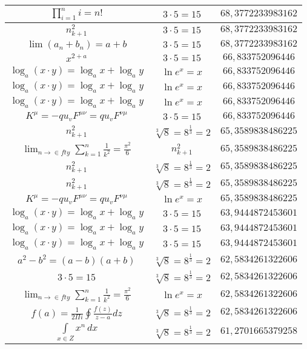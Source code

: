 \documentclass{article}
\begin{document}
\begin{flushleft}
\begin{longtable}{|c|c|c|}
$\prod_{i=1}^ni=n!$ & $3\cdot 5=15$ & $68,3772233983162$ \\ \hline 
$n_{k+1}^2$ & $3\cdot 5=15$ & $68,3772233983162$ \\ \hline 
$\lim\left(a_n+b_n\right)=a+b$ & $3\cdot 5=15$ & $68,3772233983162$ \\ \hline 
$x^{2+a}$ & $3\cdot 5=15$ & $66,833752096446$ \\ \hline 
$\log_{a}(x\cdot y)=\log_{a}x+\log_{a}y$ & $\ln e^x=x$ & $66,833752096446$ \\ \hline 
$\log_{a}(x\cdot y)=\log_{a}x+\log_{a}y$ & $\ln e^x=x$ & $66,833752096446$ \\ \hline 
$\log_{a}(x\cdot y)=\log_{a}x+\log_{a}y$ & $\ln e^x=x$ & $66,833752096446$ \\ \hline 
$K^\mu=-qu_vF^{\mu\nu}=qu_vF^{\nu\mu}$ & $3\cdot 5=15$ & $66,833752096446$ \\ \hline 
$n_{k+1}^2$ & $\sqrt[3]{8}=8^{\frac{1}{3}}=2$ & $65,3589838486225$ \\ \hline 
$\lim_{n\to\in fty}\sum_{k=1}^n\frac{1}{k^2}=\frac{\pi^2}{6}$ & $n_{k+1}^2$ & $65,3589838486225$ \\ \hline 
$n_{k+1}^2$ & $\sqrt[3]{8}=8^{\frac{1}{3}}=2$ & $65,3589838486225$ \\ \hline 
$n_{k+1}^2$ & $\sqrt[3]{8}=8^{\frac{1}{3}}=2$ & $65,3589838486225$ \\ \hline 
$K^\mu=-qu_vF^{\mu\nu}=qu_vF^{\nu\mu}$ & $\ln e^x=x$ & $65,3589838486225$ \\ \hline 
$\log_{a}(x\cdot y)=\log_{a}x+\log_{a}y$ & $3\cdot 5=15$ & $63,9444872453601$ \\ \hline 
$\log_{a}(x\cdot y)=\log_{a}x+\log_{a}y$ & $3\cdot 5=15$ & $63,9444872453601$ \\ \hline 
$\log_{a}(x\cdot y)=\log_{a}x+\log_{a}y$ & $3\cdot 5=15$ & $63,9444872453601$ \\ \hline 
$a^2-b^2=(a-b)(a+b)$ & $\sqrt[3]{8}=8^{\frac{1}{3}}=2$ & $62,5834261322606$ \\ \hline 
$3\cdot 5=15$ & $\sqrt[3]{8}=8^{\frac{1}{3}}=2$ & $62,5834261322606$ \\ \hline 
$\lim_{n\to\in fty}\sum_{k=1}^n\frac{1}{k^2}=\frac{\pi^2}{6}$ & $\ln e^x=x$ & $62,5834261322606$ \\ \hline 
$f\left(a\right)=\frac{1}{2\Pi i}\oint\frac{f\left(z\right)}{z-a}dz$ & $\sqrt[3]{8}=8^{\frac{1}{3}}=2$ & $62,5834261322606$ \\ \hline 
$\int \limits_{x\in Z}\!x^{n}\,dx$ & $\sqrt[3]{8}=8^{\frac{1}{3}}=2$ & $61,2701665379258$ \\ \hline 

\end{longtable}
\end{flushleft}
\end{document}
